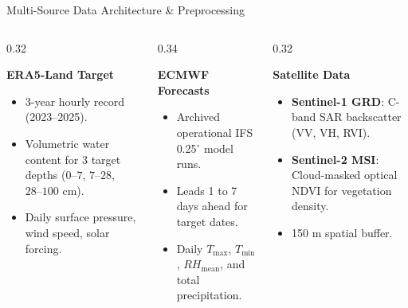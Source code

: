 \documentclass[aspectratio=169, 10pt]{beamer}
\begin{document}
\begin{frame}{Multi-Source Data Architecture \& Preprocessing}
    \begin{columns}[t]
        \begin{column}{0.32\textwidth}
            \begin{block}{\textbf{ERA5-Land Target}}
                \footnotesize
                \begin{itemize}
                    \item 3-year hourly record (2023--2025).
                    \item Volumetric water content for 3 target depths ($0\text{--}7$, $7\text{--}28$, $28\text{--}100\text{ cm}$).
                    \item Daily surface pressure, wind speed, solar forcing.
                \end{itemize}
            \end{block}
        \end{column}
        \begin{column}{0.34\textwidth}
            \begin{block}{\textbf{ECMWF Forecasts}}
                \footnotesize
                \begin{itemize}
                    \item Archived operational IFS 0.25$^\circ$ model runs.
                    \item Leads 1 to 7 days ahead for target dates.
                    \item Daily $T_{\max}$, $T_{\min}$, $RH_{\text{mean}}$, and total precipitation.
                \end{itemize}
            \end{block}
        \end{column}
        \begin{column}{0.32\textwidth}
            \begin{block}{\textbf{Satellite Data}}
                \footnotesize
                \begin{itemize}
                    \item \textbf{Sentinel-1 GRD}: C-band SAR backscatter (VV, VH, RVI).
                    \item \textbf{Sentinel-2 MSI}: Cloud-masked optical NDVI for vegetation density.
                    \item 150 m spatial buffer.
                \end{itemize}
            \end{block}
        \end{column}
    \end{columns}


\end{frame}
\end{document}
